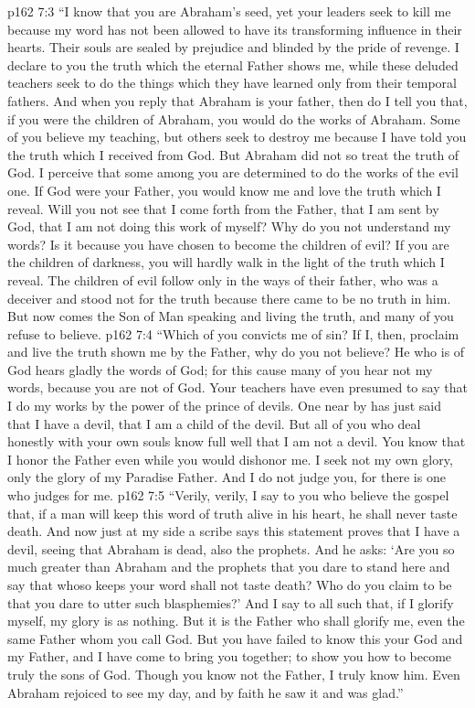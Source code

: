 \vs p162 7:3 \textcolor{ubdarkred}{“I know that you are Abraham’s seed, yet your leaders seek to kill me because my word has not been allowed to have its transforming influence in their hearts. Their souls are sealed by prejudice and blinded by the pride of revenge. I declare to you the truth which the eternal Father shows me, while these deluded teachers seek to do the things which they have learned only from their temporal fathers. And when you reply that Abraham is your father, then do I tell you that, if you were the children of Abraham, you would do the works of Abraham. Some of you believe my teaching, but others seek to destroy me because I have told you the truth which I received from God. But Abraham did not so treat the truth of God. I perceive that some among you are determined to do the works of the evil one. If God were your Father, you would know me and love the truth which I reveal. Will you not see that I come forth from the Father, that I am sent by God, that I am not doing this work of myself? Why do you not understand my words? Is it because you have chosen to become the children of evil? If you are the children of darkness, you will hardly walk in the light of the truth which I reveal. The children of evil follow only in the ways of their father, who was a deceiver and stood not for the truth because there came to be no truth in him. But now comes the Son of Man speaking and living the truth, and many of you refuse to believe.}
\vs p162 7:4 \textcolor{ubdarkred}{“Which of you convicts me of sin? If I, then, proclaim and live the truth shown me by the Father, why do you not believe? He who is of God hears gladly the words of God; for this cause many of you hear not my words, because you are not of God. Your teachers have even presumed to say that I do my works by the power of the prince of devils. One near by has just said that I have a devil, that I am a child of the devil. But all of you who deal honestly with your own souls know full well that I am not a devil. You know that I honor the Father even while you would dishonor me. I seek not my own glory, only the glory of my Paradise Father. And I do not judge you, for there is one who judges for me.}
\vs p162 7:5 \textcolor{ubdarkred}{“Verily, verily, I say to you who believe the gospel that, if a man will keep this word of truth alive in his heart, he shall never taste death. And now just at my side a scribe says this statement proves that I have a devil, seeing that Abraham is dead, also the prophets. And he asks: ‘Are you so much greater than Abraham and the prophets that you dare to stand here and say that whoso keeps your word shall not taste death? Who do you claim to be that you dare to utter such blasphemies?’ And I say to all such that, if I glorify myself, my glory is as nothing. But it is the Father who shall glorify me, even the same Father whom you call God. But you have failed to know this your God and my Father, and I have come to bring you together; to show you how to become truly the sons of God. Though you know not the Father, I truly know him. Even Abraham rejoiced to see my day, and by faith he saw it and was glad.”}
